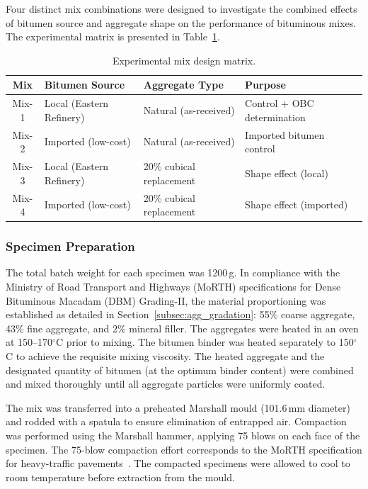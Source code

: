 \documentclass[12pt,a4paper]{article}
\begin{document}
Four distinct mix combinations were designed to investigate the combined effects of bitumen source and aggregate shape on the performance of bituminous mixes. The experimental matrix is presented in Table~\ref{tab:mix_matrix}.

\begin{table}[htbp]
    \centering
    \caption{Experimental mix design matrix.}
    \label{tab:mix_matrix}
    \begin{tabular}{@{}clll@{}}
        \toprule
        \textbf{Mix} & \textbf{Bitumen Source} & \textbf{Aggregate Type} & \textbf{Purpose} \\
        \midrule
        Mix-1 & Local (Eastern Refinery) & Natural (as-received) & Control + OBC determination \\
        Mix-2 & Imported (low-cost) & Natural (as-received) & Imported bitumen control \\
        Mix-3 & Local (Eastern Refinery) & 20\% cubical replacement & Shape effect (local) \\
        Mix-4 & Imported (low-cost) & 20\% cubical replacement & Shape effect (imported) \\
        \bottomrule
    \end{tabular}
\end{table}

\subsubsection{Specimen Preparation}

The total batch weight for each specimen was 1200\,g. In compliance with the Ministry of Road Transport and Highways (MoRTH) specifications for Dense Bituminous Macadam (DBM) Grading-II, the material proportioning was established as detailed in Section~\ref{subsec:agg_gradation}: 55\% coarse aggregate, 43\% fine aggregate, and 2\% mineral filler. The aggregates were heated in an oven at 150--170$^{\circ}$C prior to mixing. The bitumen binder was heated separately to 150$^{\circ}$C to achieve the requisite mixing viscosity. The heated aggregate and the designated quantity of bitumen (at the optimum binder content) were combined and mixed thoroughly until all aggregate particles were uniformly coated.

The mix was transferred into a preheated Marshall mould (101.6\,mm diameter) and rodded with a spatula to ensure elimination of entrapped air. Compaction was performed using the Marshall hammer, applying 75 blows on each face of the specimen. The 75-blow compaction effort corresponds to the MoRTH specification for heavy-traffic pavements~\cite{rajkumar2018experimental}. The compacted specimens were allowed to cool to room temperature before extraction from the mould.
\end{document}
